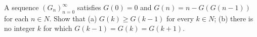 A sequence $(G_n)_{n=0}^{\infty}$ satisfies $G(0) = 0$ and $G(n) = n-G(G(n-1))$ for each $n \in N$. Show that
(a) $G(k) \ge G(k -1)$ for every $k \in N$;
(b) there is no integer $k$ for which $G(k -1) = G(k) = G(k +1)$.